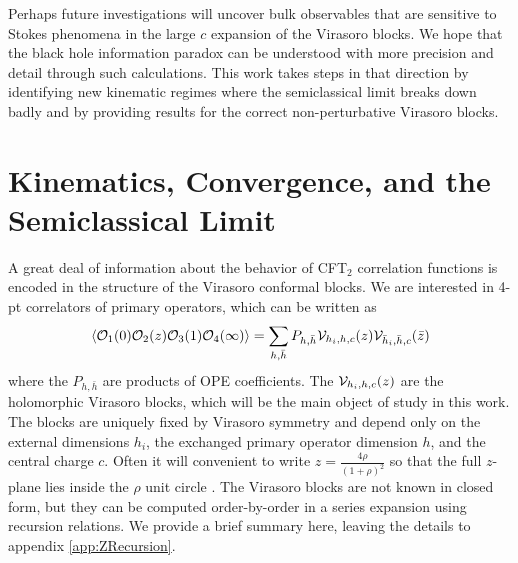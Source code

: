 \documentclass[12pt]{article}
\numberwithin{equation}{section}
\def\>{\rangle}
\def\<{\langle}
\newcommand{\be}{\begin{eqnarray}}
\newcommand{\ee}{\end{eqnarray}}
\newcommand{\CO}{{\cal O}}
\newcommand{\CV}{{\cal V}}
\begin{document}
Perhaps future investigations will uncover bulk observables that are sensitive to Stokes phenomena in the large $c$ expansion of the Virasoro blocks.  We hope that the black hole information paradox can be understood with more precision and detail through such calculations.  This work takes steps in that direction by identifying new kinematic regimes where the semiclassical limit breaks down badly and by providing results for the correct non-perturbative Virasoro blocks.


\section{Kinematics, Convergence, and the Semiclassical Limit}
\label{sec:BlocksZRR}

A great deal of information about the behavior of CFT$_2$ correlation functions is encoded in the structure of the Virasoro conformal blocks.  We are interested in 4-pt correlators of primary operators, which can be written as
\be \label{eq:GenericVirasoroDefinition}
\< \CO_1(0)  \CO_2(z) \CO_3(1) \CO_4(\infty) \> = \sum_{h, \bar h} P_{h, \bar h} \CV_{h_i, h,c}(z) \CV_{\bar h_i, \bar h,c}(\bar z)
\ee
where the $P_{h, \bar h}$ are products of OPE coefficients.  The $\CV_{h_i, h,c}(z)$ are the holomorphic Virasoro blocks, which will be the main object of study in this work.    The blocks are uniquely fixed by Virasoro symmetry and depend only on the external dimensions $h_i$, the exchanged primary operator dimension $h$, and the central charge $c$.  Often it will convenient to write $z = \frac{4 \rho}{(1+\rho)^2}$ so that the full $z$-plane lies inside the $\rho$ unit circle \cite{Pappadopulo:2012jk}.  The Virasoro blocks are not known in closed form, but they can be computed order-by-order in a series expansion using  recursion relations.  We provide a brief summary here, leaving the details to appendix \ref{app:ZRecursion}. 
\end{document}
